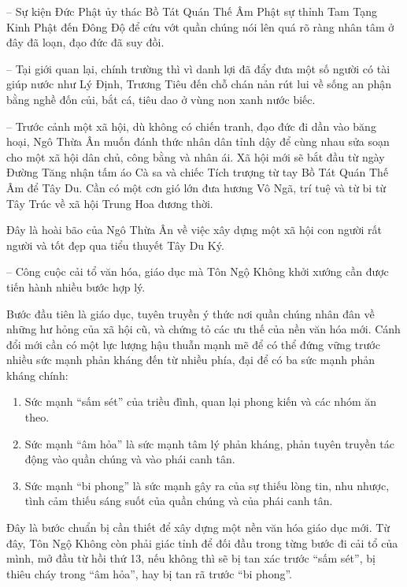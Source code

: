 -- Sự kiện Đức Phật ủy thác Bồ Tát Quán Thế Âm Phật sự thỉnh Tam Tạng Kinh Phật đến Đông Độ để cứu vớt quần chúng nói lên quá rõ ràng nhân tâm ở đây đã loạn, đạo đức đã suy đồi.

-- Tại giới quan lại, chính trường thì vì danh lợi đã đẩy đưa một số người có tài giúp nước như Lý Định, Trương Tiêu đến chỗ chán nản rút lui về sống an phận bằng nghề đốn củi, bắt cá, tiêu dao ở vùng non xanh nước biếc.

-- Trước cảnh một xã hội, dù không có chiến tranh, đạo đức đi dần vào băng hoại, Ngô Thừa Ân muốn đánh thức nhân dân tỉnh dậy để cùng nhau sửa soạn cho một xã hội dân chủ, công bằng và nhân ái. Xã hội mới sẽ bắt đầu từ ngày Đường Tăng nhận tấm áo Cà sa và chiếc Tích trượng từ tay Bồ Tát Quán Thế Âm để Tây Du. Cần có một cơn gió lớn đưa hương Vô Ngã, trí tuệ và từ bi từ Tây Trúc về xã hội Trung Hoa đương thời.

Đây là hoài bão của Ngô Thừa Ân về việc xây dựng một xã hội con người rất người và tốt đẹp qua tiểu thuyết Tây Du Ký.

-- Công cuộc cải tổ văn hóa, giáo dục mà Tôn Ngộ Không khởi xướng cần được tiến hành nhiều bước hợp lý.

Bước đầu tiên là giáo dục, tuyên truyền ý thức nơi quần chúng nhân đân về những hư hỏng của xã hội cũ, và chứng tỏ các ưu thế của nền văn hóa mới. Cánh đổi mới cần có một lực lượng hậu thuẫn mạnh mẽ để có thể đứng vững trước nhiều sức mạnh phản kháng đến từ nhiều phía, đại để có ba sức mạnh phản kháng chính:

\begin{enumerate}[label=\itshape\arabic*\upshape/]
    \item Sức mạnh ``sấm sét'' của triều đình, quan lại phong kiến và các nhóm ăn theo.

    \item Sức mạnh ``âm hỏa'' là sức mạnh tâm lý phản kháng, phản tuyên truyền tác động vào quần chúng và vào phái canh tân.

    \item Sức mạnh ``bi phong'' là sức mạnh gây ra của sự thiếu lòng tin, nhu nhược, tình cảm thiếu sáng suốt của quần chúng và của phái canh tân.
\end{enumerate}

Đây là bước chuẩn bị cần thiết để xây dựng một nền văn hóa giáo dục mới. Từ đây, Tôn Ngộ Không còn phải giác tỉnh để đối đầu trong từng bước đi cải tổ của mình, mở đầu từ hồi thứ 13, nếu không thì sẽ bị tan xác trước ``sấm sét'', bị thiêu cháy trong ``âm hỏa'', hay bị tan rã trước ``bi phong''.

